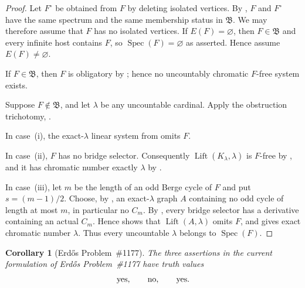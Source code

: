 \documentclass[11pt]{amsart}
\newtheorem{corollary}[corollary]{Corollary}
\theoremstyle{definition}
\theoremstyle{remark}
\numberwithin{equation}{section}
\DeclareMathOperator{\Spec}{Spec}
\newcommand{\Bclass}{\mathfrak B}
\newcommand{\Lift}{\operatorname{Lift}}
\begin{document}
\begin{proof}
Let $F^\circ$ be obtained from $F$ by deleting isolated vertices.  By
, $F$ and $F^\circ$ have the same spectrum
and the same membership status in $\Bclass$.  We may therefore assume
that $F$ has no isolated vertices.  If $E(F)=\varnothing$, then
$F\in\Bclass$ and every infinite host contains $F$, so
$\Spec(F)=\varnothing$ as asserted.  Hence assume $E(F)\ne\varnothing$.

If $F\in\Bclass$, then $F$ is obligatory by
; hence no uncountably chromatic $F$-free
system exists.

Suppose $F\notin\Bclass$, and let $\lambda$ be any uncountable
cardinal.  Apply the obstruction trichotomy, .

In case~\textup{(i)}, the exact-$\lambda$ linear system from
 omits $F$.

In case~\textup{(ii)}, $F$ has no bridge selector.  Consequently
$\Lift(K_\lambda,\lambda)$ is $F$-free by
, and it has chromatic
number exactly $\lambda$ by .

In case~\textup{(iii)}, let $m$ be the length of an odd Berge cycle of
$F$ and put $s=(m-1)/2$.  Choose, by , an
exact-$\lambda$ graph $A$ containing no odd cycle of length at most $m$,
in particular no $C_m$.  By , every bridge
selector has a derivative containing an actual $C_m$.  Hence
 shows that
$\Lift(A,\lambda)$ omits $F$, and  gives exact
chromatic number $\lambda$.
Thus every uncountable $\lambda$ belongs to $\Spec(F)$.
\end{proof}

\begin{corollary}[Erd\H{o}s Problem~\#1177]
\label{thm:1177}
The three assertions in the current formulation of Erd\H{o}s
Problem~\#1177 have truth values
\[
 \textnormal{yes},\qquad \textnormal{no},\qquad \textnormal{yes}.
\]
\end{corollary}
\end{document}
